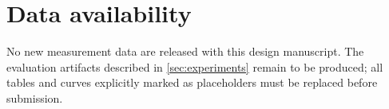 \documentclass[preprint,12pt]{elsarticle}
\theoremstyle{remark}
\begin{document}
\section*{Data availability}
No new measurement data are released with this design manuscript. The evaluation artifacts described in \cref{sec:experiments} remain to be produced; all tables and curves explicitly marked as placeholders must be replaced before submission.

\appendix





\end{document}

